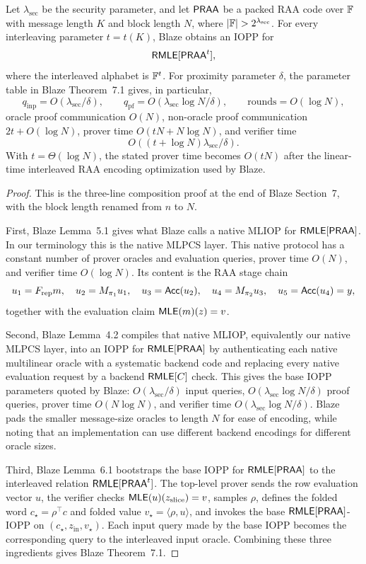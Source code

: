 \begin{theorem}
\label{thm:blaze-final-composition-replay}
Let \(\lambda_{\mathrm{sec}}\) be the security parameter, and let \(\mathsf{PRAA}\) be
a packed RAA code over \(\mathbb{F}\) with message length \(K\) and block length \(N\),
where \(|\F|>2^{\lambda_{\mathrm{sec}}}\).  For every interleaving parameter
\(t=t(K)\), Blaze obtains an IOPP for
\[
  \mathsf{RMLE}[\mathsf{PRAA}^t],
\]
where the interleaved alphabet is \(\mathbb{F}^t\).  For proximity parameter \(\delta\),
the parameter table in Blaze Theorem~7.1 gives, in particular,
\[
  q_{\mathrm{inp}}=O(\lambda_{\mathrm{sec}}/\delta),
  \qquad
  q_{\mathrm{pf}}=O(\lambda_{\mathrm{sec}}\log N/\delta),
  \qquad
  \mathrm{rounds}=O(\log N),
\]
oracle proof communication \(O(N)\), non-oracle proof communication
\(2t+O(\log N)\), prover time \(O(tN+N\log N)\), and verifier time
\[
  O((t+\log N)\lambda_{\mathrm{sec}}/\delta).
\]
With \(t=\Theta(\log N)\), the stated prover time becomes \(O(tN)\) after the
linear-time interleaved RAA encoding optimization used by Blaze.
\end{theorem}

\begin{proof}
This is the three-line composition proof at the end of Blaze Section~7, with
the block length renamed from \(n\) to \(N\).

First, Blaze Lemma~5.1 gives what Blaze calls a native MLIOP for
\(\mathsf{RMLE}[\mathsf{PRAA}]\).  In our terminology this is the native MLPCS layer.  This
native protocol has a constant number of prover oracles and evaluation queries,
prover time \(O(N)\), and verifier time \(O(\log N)\).  Its content is the RAA
stage chain
\[
  u_1=F_{\mathrm{rep}}m,\quad
  u_2=M_{\pi_1}u_1,\quad
  u_3=\mathsf{Acc}(u_2),\quad
  u_4=M_{\pi_2}u_3,\quad
  u_5=\mathsf{Acc}(u_4)=y,
\]
together with the evaluation claim \(\mathsf{MLE}(m)(z)=v\).

Second, Blaze Lemma~4.2 compiles that native MLIOP, equivalently our native
MLPCS layer, into an IOPP for \(\mathsf{RMLE}[\mathsf{PRAA}]\) by authenticating each native
multilinear oracle with a
systematic backend code and replacing every native evaluation request by a
backend \(\mathsf{RMLE}[C]\) check.  This gives the base IOPP parameters quoted by
Blaze: \(O(\lambda_{\mathrm{sec}}/\delta)\) input queries,
\(O(\lambda_{\mathrm{sec}}\log N/\delta)\) proof queries, prover time
\(O(N\log N)\), and verifier time
\(O(\lambda_{\mathrm{sec}}\log N/\delta)\).  Blaze pads the smaller
message-size oracles to length \(N\) for ease of encoding, while noting that an
implementation can use different backend encodings for different oracle sizes.

Third, Blaze Lemma~6.1 bootstraps the base IOPP for \(\mathsf{RMLE}[\mathsf{PRAA}]\) to the
interleaved relation \(\mathsf{RMLE}[\mathsf{PRAA}^t]\).  The top-level prover sends the row
evaluation vector \(u\), the verifier checks \(\mathsf{MLE}(u)(z_{\mathrm{slice}})=v\),
samples \(\rho\), defines the folded word \(c_\star=\rho^\top c\) and folded
value \(v_\star=\langle\rho,u\rangle\), and invokes the base
\(\mathsf{RMLE}[\mathsf{PRAA}]\)-IOPP on \((c_\star,z_{\mathrm{in}},v_\star)\).  Each input
query made by the base IOPP becomes the corresponding query to the interleaved
input oracle.  Combining these three ingredients gives Blaze Theorem~7.1.
\end{proof}

